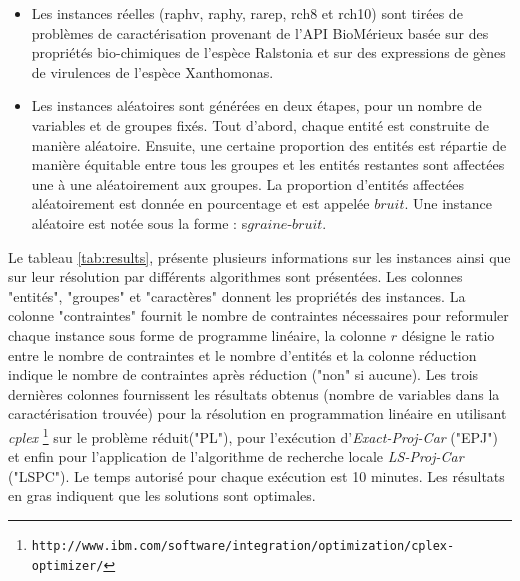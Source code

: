 \begin{itemize}
\item Les instances réelles (raphv, raphy, rarep, rch8 et rch10) sont tirées de problèmes de caractérisation provenant de l'API BioMérieux basée sur des propriétés bio-chimiques de l'espèce Ralstonia et sur des expressions de gènes de virulences de l'espèce Xanthomonas.
\item Les instances aléatoires sont générées en deux étapes, pour un nombre de variables et de groupes fixés. Tout d'abord, chaque entité est construite de manière aléatoire. Ensuite, une certaine proportion des
entités est répartie de manière équitable entre tous les groupes et les entités
restantes sont affectées une à une aléatoirement aux groupes. La proportion
d'entités affectées aléatoirement est donnée en pourcentage et est appelée
$bruit$. Une instance aléatoire est notée sous la forme : s$graine$-$bruit$.
\end{itemize}

Le tableau \ref{tab:results}, présente plusieurs informations sur les instances ainsi que sur leur résolution par différents algorithmes sont présentées. Les colonnes "entités", "groupes" et "caractères" donnent les propriétés des instances. La colonne "contraintes" fournit le nombre de contraintes nécessaires pour reformuler chaque instance sous forme de programme linéaire, la colonne $r$ désigne le ratio entre le nombre de contraintes et le nombre d'entités et la colonne réduction indique le nombre de contraintes après réduction ("non" si aucune). Les trois dernières colonnes fournissent les résultats obtenus (nombre de variables dans la caractérisation trouvée) pour la résolution en programmation linéaire en utilisant \emph{cplex}  \footnote{\texttt{http://www.ibm.com/software/integration/optimization/cplex-optimizer/}} sur le problème réduit("PL"), pour l'exécution d'\emph{Exact-Proj-Car} ("EPJ") et enfin pour l'application de l'algorithme de recherche locale \emph{LS-Proj-Car} ("LSPC"). Le temps
autorisé pour chaque exécution est 10 minutes.
Les résultats en gras indiquent que les solutions sont optimales.











